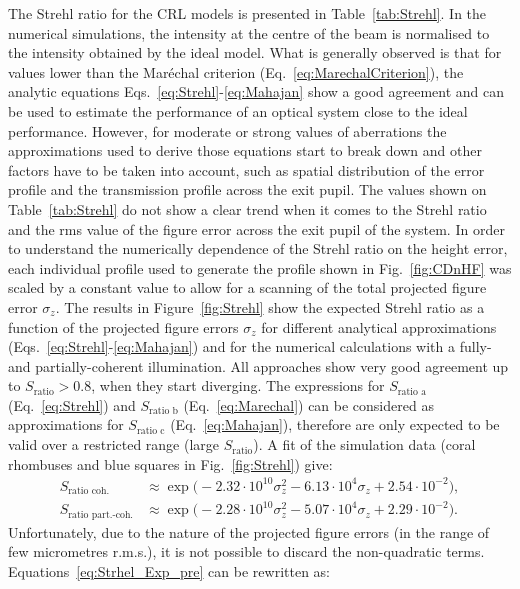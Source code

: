 \begin{refsection}
The Strehl ratio for the CRL models is presented in Table~\ref{tab:Strehl}. In the numerical simulations, the intensity at the centre of the beam is normalised to the intensity obtained by the ideal model. What is generally observed is that for values lower than the  Mar\'echal criterion (Eq.~\ref{eq:MarechalCriterion}), the analytic equations Eqs.~\ref{eq:Strehl}-\ref{eq:Mahajan} show a good agreement and can be used to estimate the performance of an optical system close to the ideal performance. However, for moderate or strong values of aberrations the approximations used to derive those equations start to break down and other factors have to be taken into account, such as spatial distribution of the error profile and the transmission profile across the exit pupil. The values shown on Table~\ref{tab:Strehl} do not show a clear trend when it comes to the Strehl ratio and the rms value of the figure error across the exit pupil of the system. In order to understand the numerically dependence of the Strehl ratio on the height error, each individual profile used to generate the profile shown in Fig.~\ref{fig:CDnHF} was scaled by a constant value to allow for a scanning of the total projected figure error $\sigma_z$. The results in Figure~\ref{fig:Strehl} show the expected Strehl ratio as a function of the projected figure errors $\sigma_z$ for different analytical approximations (Eqs.~\ref{eq:Strehl}-\ref{eq:Mahajan}) and for the numerical calculations with a fully- and partially-coherent illumination. All approaches show very good agreement up to $S_\text{ratio}>0.8$, when they start diverging. The expressions for $S_\text{ratio a}$ (Eq.~\ref{eq:Strehl}) and  $S_\text{ratio b}$ (Eq.~\ref{eq:Marechal}) can be considered as approximations for $S_\text{ratio c}$ (Eq.~\ref{eq:Mahajan}), therefore are only expected to be valid over a restricted range (large $S_\text{ratio}$). A fit of the simulation data (coral rhombuses and blue squares in Fig.~\ref{fig:Strehl}) give:
\begin{subequations}\label{eq:Strhel_Exp_pre}
\begin{align}
    S_{\text{ratio coh.}}&\approx\exp{\big(-2.32\cdot10^{10}\sigma_z^2 -6.13\cdot10^4\sigma_z + 2.54\cdot10^{-2}\big)},\\
    S_{\text{ratio part.-coh.}}&\approx\exp{\big(-2.28\cdot10^{10}\sigma_z^2 -5.07\cdot10^4\sigma_z + 2.29\cdot10^{-2}\big)}.
\end{align}
\end{subequations}
Unfortunately, due to the nature of the projected figure errors (in the range of few micrometres r.m.s.), it is not possible to discard the non-quadratic terms. Equations~\ref{eq:Strhel_Exp_pre} can be rewritten as:

\end{refsection}
